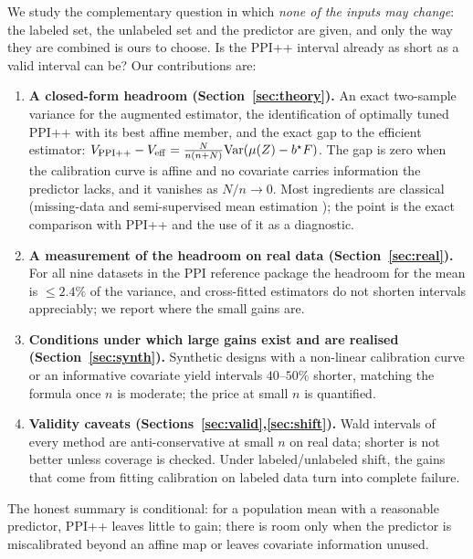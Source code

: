 \documentclass{article}
\newcommand{\Var}{\mathrm{Var}}
\begin{document}
We study the complementary question in which \emph{none of the inputs may change}: the labeled set, the unlabeled set and the predictor are given, and only the way they are combined is ours to choose. Is the PPI++ interval already as short as a valid interval can be? Our contributions are:
\begin{enumerate}
\item \textbf{A closed-form headroom (Section~\ref{sec:theory}).} An exact two-sample variance for the augmented estimator, the identification of optimally tuned PPI++ with its best affine member, and the exact gap to the efficient estimator: $V_{\rm PPI++}-V_{\rm eff}=\frac{N}{n(n+N)}\Var(\mu(Z)-b^\star F)$. The gap is zero when the calibration curve is affine and no covariate carries information the predictor lacks, and it vanishes as $N/n\to0$. Most ingredients are classical (missing-data and semi-supervised mean estimation \citep{robins1994estimation,zhang2019semisup}); the point is the exact comparison with PPI++ and the use of it as a diagnostic.
\item \textbf{A measurement of the headroom on real data (Section~\ref{sec:real}).} For all nine datasets in the PPI reference package the headroom for the mean is $\le2.4\%$ of the variance, and cross-fitted estimators do not shorten intervals appreciably; we report where the small gains are.
\item \textbf{Conditions under which large gains exist and are realised (Section~\ref{sec:synth}).} Synthetic designs with a non-linear calibration curve or an informative covariate yield intervals $40$--$50\%$ shorter, matching the formula once $n$ is moderate; the price at small $n$ is quantified.
\item \textbf{Validity caveats (Sections~\ref{sec:valid},\ref{sec:shift}).} Wald intervals of every method are anti-conservative at small $n$ on real data; shorter is not better unless coverage is checked. Under labeled/unlabeled shift, the gains that come from fitting calibration on labeled data turn into complete failure.
\end{enumerate}
The honest summary is conditional: for a population mean with a reasonable predictor, PPI++ leaves little to gain; there is room only when the predictor is miscalibrated beyond an affine map or leaves covariate information unused.
\end{document}
